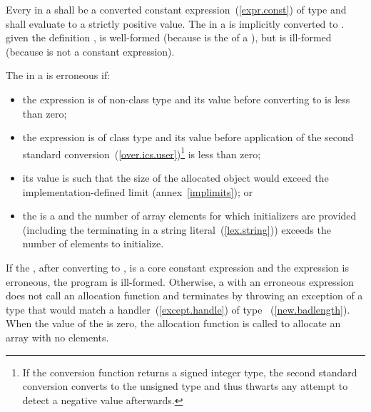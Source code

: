 \pnum
Every  in a
 shall be a converted constant
expression~(\ref{expr.const}) of type  and
shall evaluate to a strictly positive value.
%
The  in a is
implicitly converted to .
\enterexample
given the definition ,
 is well-formed (because  is the
 of a ), but
 is ill-formed (because  is not a
constant expression).
\exitexample 

\pnum
{}%
The  in a  is
erroneous if:

\begin{itemize}
\item
the expression is of non-class type and its value before converting to
 is less than zero;

\item
the expression is of class type and its value before application of the second
standard conversion~(\ref{over.ics.user})\footnote{If the conversion function
returns a signed integer type, the second standard conversion converts to the
unsigned type  and thus thwarts any attempt to detect a
negative value afterwards.} is less than zero;

\item
its value is such that the size of the allocated object would exceed the
implementation-defined limit (annex~\ref{implimits}); or

\item
the  is a  and the
number of array elements for which initializers are provided (including the
terminating  in a string literal~(\ref{lex.string})) exceeds the
number of elements to initialize.
\end{itemize}

If the , after converting to , is a
core constant expression and the expression is erroneous, the program is
ill-formed. Otherwise, a  with an erroneous
expression does not call an allocation function and terminates by throwing an
exception of a type that would match a handler~(\ref{except.handle}) of type
~(\ref{new.badlength}).
When the value of the  is zero, the allocation
function is called to allocate an array with no elements.

